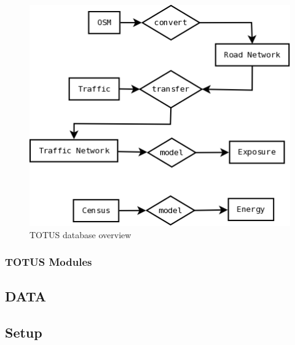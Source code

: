 \begin{figure}
	\caption{TOTUS database overview}
	\label{fig:db_diag}
	\includegraphics[width = 12cm]{system_data.png}
\end{figure}

\subsubsection*{TOTUS Modules}

\subsection*{DATA}

\subsection{Setup}
